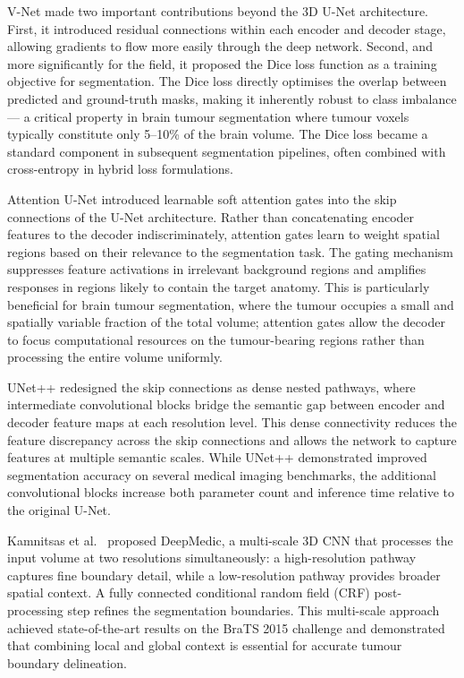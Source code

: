 \documentclass{article}
\begin{document}
V-Net \cite{milletari2016vnet} made two important contributions beyond the 3D
U-Net architecture. First, it introduced residual connections within each encoder
and decoder stage, allowing gradients to flow more easily through the deep network.
Second, and more significantly for the field, it proposed the Dice loss function
as a training objective for segmentation. The Dice loss directly optimises the
overlap between predicted and ground-truth masks, making it inherently robust to
class imbalance --- a critical property in brain tumour segmentation where tumour
voxels typically constitute only 5--10\% of the brain volume. The Dice loss became
a standard component in subsequent segmentation pipelines, often combined with
cross-entropy in hybrid loss formulations.

Attention U-Net \cite{oktay2018attention} introduced learnable soft attention
gates into the skip connections of the U-Net architecture. Rather than
concatenating encoder features to the decoder indiscriminately, attention gates
learn to weight spatial regions based on their relevance to the segmentation
task. The gating mechanism suppresses feature activations in irrelevant
background regions and amplifies responses in regions likely to contain the
target anatomy. This is particularly beneficial for brain tumour segmentation,
where the tumour occupies a small and spatially variable fraction of the total
volume; attention gates allow the decoder to focus computational resources on
the tumour-bearing regions rather than processing the entire volume uniformly.

UNet++ \cite{zhou2018unetpp} redesigned the skip connections as dense nested
pathways, where intermediate convolutional blocks bridge the semantic gap
between encoder and decoder feature maps at each resolution level. This dense
connectivity reduces the feature discrepancy across the skip connections and
allows the network to capture features at multiple semantic scales. While UNet++
demonstrated improved segmentation accuracy on several medical imaging benchmarks,
the additional convolutional blocks increase both parameter count and inference
time relative to the original U-Net.

Kamnitsas et al.\ \cite{kamnitsas2017efficient} proposed DeepMedic, a
multi-scale 3D CNN that processes the input volume at two resolutions
simultaneously: a high-resolution pathway captures fine boundary detail, while
a low-resolution pathway provides broader spatial context. A fully connected
conditional random field (CRF) post-processing step refines the segmentation
boundaries. This multi-scale approach achieved state-of-the-art results on the
BraTS 2015 challenge and demonstrated that combining local and global context
is essential for accurate tumour boundary delineation.
\end{document}
